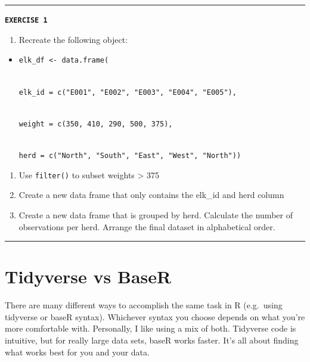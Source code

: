\documentclass[
]{book}
\providecommand{\tightlist}{%
  \setlength{\itemsep}{0pt}\setlength{\parskip}{0pt}}
\begin{document}
\begin{center}\rule{0.5\linewidth}{0.5pt}\end{center}

\textbf{\texttt{EXERCISE\ 1}}

\begin{enumerate}
\def\labelenumi{\arabic{enumi}.}
\tightlist
\item
  Recreate the following object:
\end{enumerate}

\begin{itemize}
\tightlist
\item
  \texttt{elk\_df\ \textless{}-\ data.frame(}\strut \\
  \texttt{elk\_id\ =\ c("E001",\ "E002",\ "E003",\ "E004",\ "E005"),}\strut \\
  \texttt{weight\ =\ c(350,\ 410,\ 290,\ 500,\ 375),}\strut \\
  \texttt{herd\ =\ c("North",\ "South",\ "East",\ "West",\ "North"))}
\end{itemize}

\begin{enumerate}
\def\labelenumi{\arabic{enumi}.}
\setcounter{enumi}{1}
\tightlist
\item
  Use \texttt{filter()} to subset weights \textgreater{} 375
\item
  Create a new data frame that only contains the elk\_id and herd column
\item
  Create a new data frame that is grouped by herd. Calculate the number of observations per herd. Arrange the final dataset in alphabetical order.
\end{enumerate}

\begin{center}\rule{0.5\linewidth}{0.5pt}\end{center}

\section{Tidyverse vs BaseR}\label{tidyverse-vs-baser}

There are many different ways to accomplish the same task in R (e.g.~using tidyverse or baseR syntax). Whichever syntax you choose depends on what you're more comfortable with. Personally, I like using a mix of both. Tidyverse code is intuitive, but for really large data sets, baseR works faster. It's all about finding what works best for you and your data.
\end{document}
